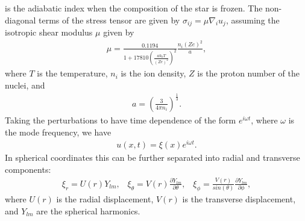 \documentclass[fleqn,usenatbib]{mnras}
\begin{document}
\noindent is the adiabatic index when the composition of the star is frozen. The non-diagonal terms of the stress tensor are given by $\sigma_{ij} = \mu \nabla_i u_j$, assuming the isotropic shear modulus $\mu$ given by \citet{strohmayer1991shear}
\begin{align}
\mu=\frac{0.1194}{1+17810\left(\frac{ak_bT}{\left(Ze\right)^2}\right)^2}\frac{n_i\left(Ze\right)^2}{a},
\label{eq:mu_1991}
\end{align}
\noindent where $T$ is the temperature, $n_i$ is the ion density, $Z$ is the proton number of the nuclei, and 
\begin{align}
a=\left(\frac{3}{4\pi n_i}\right)^{\frac{1}{3}}.
\label{eq:mu_1991_a}
\end{align}
\noindent Taking the perturbations to have time dependence of the form $e^{i\omega t}$, where $\omega$ is the mode frequency, we have 
\begin{align}
u(x,t)=\xi(x)e^{i\omega t}.
\label{eq:time_seperation}
\end{align}
\noindent In spherical coordinates this can be further separated into radial and transverse components:
\begin{align}
\xi_r=U(r)Y_{lm},\;\;\;\xi_{\theta}=V(r)\frac{\partial Y_{lm}}{\partial\theta},\;\;\;\xi_{\phi}=\frac{V(r)}{sin(\theta)}\frac{\partial Y_{lm}}{\partial\phi},
\label{eq:xi_seperation}
\end{align}
\noindent where $U(r)$ is the radial displacement, $V(r)$ is the transverse displacement, and $Y_{lm}$ are the spherical harmonics.
\end{document}
